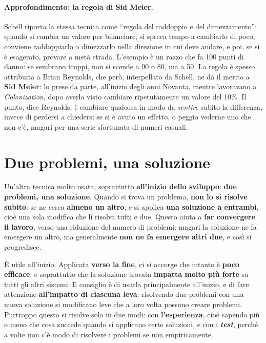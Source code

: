 \paragraph{Approfondimento: la regola di Sid Meier.} Schell riporta la stessa tecnica come
``regola del raddoppio e del dimezzamento'': quando si cambia un valore per bilanciare, si
spreca tempo a cambiarlo di poco; conviene raddoppiarlo o dimezzarlo nella direzione in cui
deve andare, e poi, se si è esagerato, provare a metà strada. L'esempio è un razzo che fa 100
punti di danno: se sembrano troppi, non si scende a 90 o 80, ma a 50. La regola è spesso
attribuita a Brian Reynolds, che però, interpellato da Schell, ne dà il merito a \textbf{Sid
Meier}: lo prese da parte, all'inizio degli anni Novanta, mentre lavoravano a
\emph{Colonization}, dopo averlo visto cambiare ripetutamente un valore del 10\%. Il punto,
dice Reynolds, è cambiare qualcosa in modo da \emph{sentire} subito la differenza, invece di
perdersi a chiedersi se si è avuto un effetto, o peggio vederne uno che non c'è, magari per
una serie sfortunata di numeri casuali.

\section{Due problemi, una soluzione}
\label{a14:sec:dueproblemi}

Un'altra tecnica molto usata, soprattutto \textbf{all'inizio dello sviluppo}: \textbf{due
problemi, una soluzione}. Quando si trova un problema, \textbf{non lo si risolve subito}: se ne
cerca \textbf{almeno un altro}, e si applica \textbf{una soluzione a entrambi}, cioè una sola
modifica che li risolva tutti e due. Questo aiuta a \textbf{far convergere il lavoro}, verso
una riduzione del numero di problemi: magari la soluzione ne fa emergere un altro, ma
generalmente \textbf{non ne fa emergere altri due}, e così si progredisce.

È utile all'inizio. Applicata \textbf{verso la fine}, ci si accorge che intanto è \textbf{poco
efficace}, e soprattutto che la soluzione trovata \textbf{impatta molto più forte} su tutti gli
altri sistemi. Il consiglio è di usarla principalmente all'inizio, e di fare attenzione
\textbf{all'impatto di ciascuna leva}: risolvendo due problemi con una nuova soluzione si
modificano leve che a loro volta possono creare problemi. Purtroppo questo si risolve solo in
due modi: con \textbf{l'esperienza}, cioè sapendo più o meno che cosa succede quando si
applicano certe soluzioni, e con i \textbf{\emph{test}}, perché a volte non c'è modo di
risolvere i problemi se non empiricamente.

